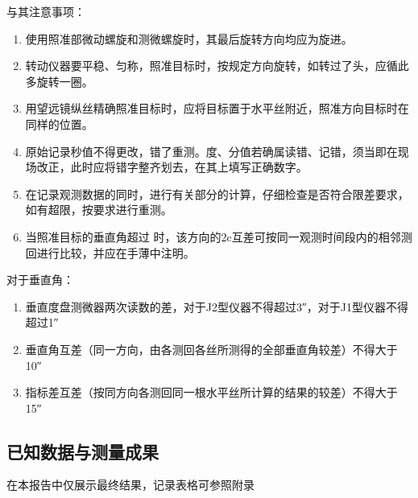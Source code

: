 \documentclass[a4paper,16pt,UTF8]{article}
\begin{document}
与其注意事项：
\begin{center}
    \begin{enumerate}
        \item  使用照准部微动螺旋和测微螺旋时，其最后旋转方向均应为旋进。
        \item 转动仪器要平稳、匀称，照准目标时，按规定方向旋转，如转过了头，应循此多旋转一圈。
        \item 用望远镜纵丝精确照准目标时，应将目标置于水平丝附近，照准方向目标时在同样的位置。
        \item 原始记录秒值不得更改，错了重测。度、分值若确属读错、记错，须当即在现场改正，此时应将错字整齐划去，在其上填写正确数字。
        \item 在记录观测数据的同时，进行有关部分的计算，仔细检查是否符合限差要求，如有超限，按要求进行重测。
        \item 当照准目标的垂直角超过 时，该方向的2c互差可按同一观测时间段内的相邻测回进行比较，并应在手薄中注明。
    \end{enumerate}
\end{center}

对于垂直角：
\begin{center}
    \begin{enumerate}
        \item  垂直度盘测微器两次读数的差，对于J2型仪器不得超过3″，对于J1型仪器不得超过1″
        \item 垂直角互差（同一方向，由各测回各丝所测得的全部垂直角较差）不得大于10″
        \item 指标差互差（按同方向各测回同一根水平丝所计算的结果的较差）不得大于15″
    \end{enumerate}
\end{center}


\subsection{已知数据与测量成果}

在本报告中仅展示最终结果，记录表格可参照附录
\end{document}
